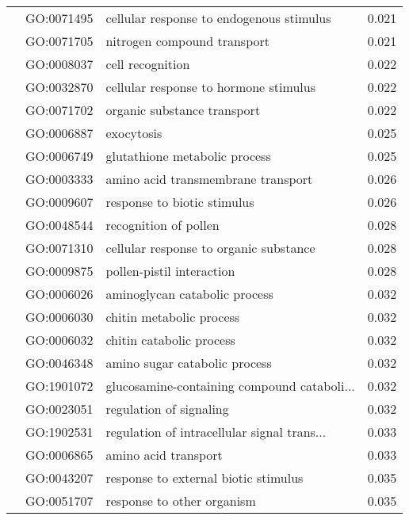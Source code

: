 \begin{longtable}{lllr}
   & GO:0071495 &     cellular response to endogenous stimulus &         0.021 \\
   & GO:0071705 &                  nitrogen compound transport &         0.021 \\
   & GO:0008037 &                             cell recognition &         0.022 \\
   & GO:0032870 &        cellular response to hormone stimulus &         0.022 \\
   & GO:0071702 &                  organic substance transport &         0.022 \\
   & GO:0006887 &                                   exocytosis &         0.025 \\
   & GO:0006749 &                glutathione metabolic process &         0.025 \\
   & GO:0003333 &           amino acid transmembrane transport &         0.026 \\
   & GO:0009607 &                  response to biotic stimulus &         0.026 \\
   & GO:0048544 &                        recognition of pollen &         0.028 \\
   & GO:0071310 &       cellular response to organic substance &         0.028 \\
   & GO:0009875 &                    pollen-pistil interaction &         0.028 \\
   & GO:0006026 &                aminoglycan catabolic process &         0.032 \\
   & GO:0006030 &                     chitin metabolic process &         0.032 \\
   & GO:0006032 &                     chitin catabolic process &         0.032 \\
   & GO:0046348 &                amino sugar catabolic process &         0.032 \\
   & GO:1901072 &  glucosamine-containing compound cataboli... &         0.032 \\
   & GO:0023051 &                      regulation of signaling &         0.032 \\
   & GO:1902531 &  regulation of intracellular signal trans... &         0.033 \\
   & GO:0006865 &                         amino acid transport &         0.033 \\
   & GO:0043207 &         response to external biotic stimulus &         0.035 \\
   & GO:0051707 &                   response to other organism &         0.035 \\

\end{longtable}
